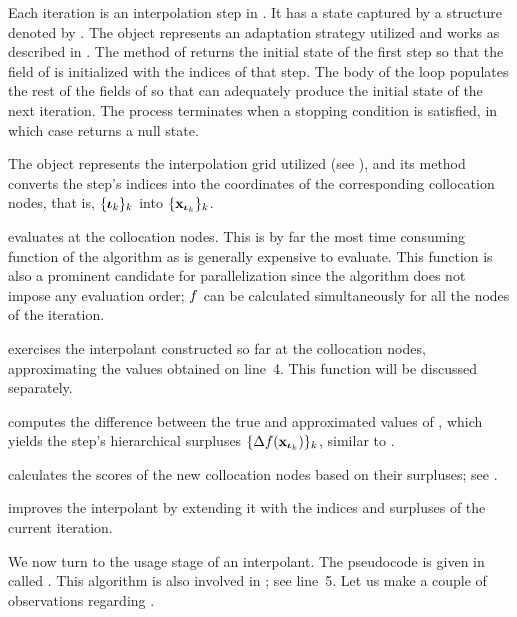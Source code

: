 \begin{compactlist}

 Each iteration is an interpolation step in .
It has a state captured by a structure denoted by . The
 object represents an adaptation strategy utilized and works as
described in . The  method of 
returns the initial state of the first step so that the  field of
 is initialized with the indices of that step. The body of the loop
populates the rest of the fields of  so that  can
adequately produce the initial state of the next iteration. The process
terminates when a stopping condition is satisfied, in which case 
returns a null state.


 The  object represents the interpolation grid
utilized (see ), and its  method converts the step's
indices into the coordinates of the corresponding collocation nodes, that is,
$\{ {\bm{\iota}}_k \}_k$ into $\{ \mathbf{x}_{{\bm{\iota}}_k} \}_k$.

  evaluates  at the collocation
nodes. This is by far the most time consuming function of the algorithm as
 is generally expensive to evaluate. This function is also a
prominent candidate for parallelization since the algorithm does not impose any
evaluation order; $f$ can be calculated simultaneously for all the nodes of the
iteration.

  exercises the interpolant constructed so far at
the collocation nodes, approximating the values obtained on line~4. This
function will be discussed separately.

  computes the difference between the true and
approximated values of , which yields the step's hierarchical
surpluses $\{ \Delta f(\mathbf{x}_{{\bm{\iota}}_k}) \}_k$, similar to .

  calculates the scores of the new
collocation nodes based on their surpluses; see .

  improves the interpolant by extending it with the
indices and surpluses of the current iteration.

\end{compactlist}

We now turn to the usage stage of an interpolant. The pseudocode is given in
 called . This algorithm is also involved in
; see line~5. Let us make a couple of observations regarding
.

